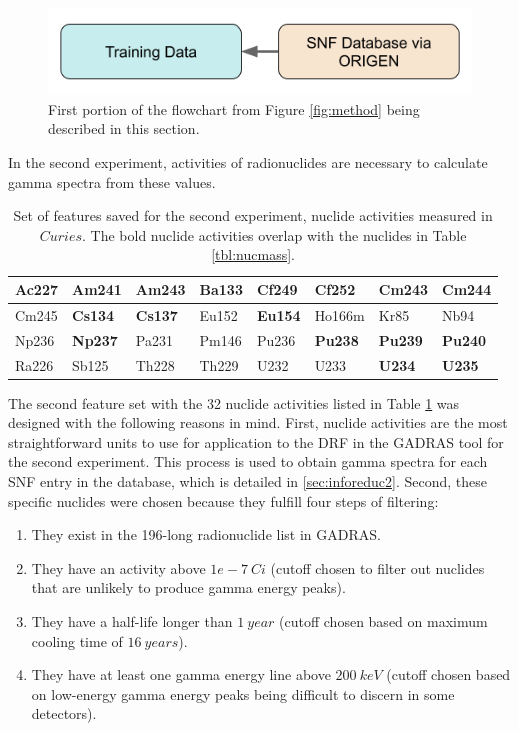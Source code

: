 \begin{figure}[H]
  \centering
  \includegraphics[width=0.7\linewidth]{./chapters/exp1/methodology1.png}
  \caption{First portion of the flowchart from Figure \ref{fig:method} being 
           described in this section.}
\end{figure}


In the second experiment, activities of radionuclides are necessary to
calculate gamma spectra from these values.

\begin{table}[!htb]
  \centering
  \begin{tabular}{@{}|l|l|l|l|l|l|l|l|@{}}
    \hline
    Ac227&\textbf{Am241}&\textbf{Am243}&Ba133&Cf249         &Cf252          &Cm243         &\textbf{Cm244} \\ \hline
    Cm245&\textbf{Cs134}&\textbf{Cs137}&Eu152&\textbf{Eu154}&Ho166m         &Kr85          &Nb94           \\ \hline
    Np236&\textbf{Np237}&Pa231         &Pm146&Pu236         &\textbf{Pu238} &\textbf{Pu239}&\textbf{Pu240} \\ \hline
    Ra226&Sb125         &Th228         &Th229&U232          & U233          &\textbf{U234} &\textbf{U235}  \\ \hline
  \end{tabular}
  \caption{Set of features saved for the second experiment, nuclide activities
           measured in $Curies$. The bold nuclide activities overlap with the 
           nuclides in Table \ref{tbl:nucmass}.}
  \label{tbl:nucacts}
\end{table}

The second feature set with the 32 nuclide activities listed in Table
\ref{tbl:nucacts} was designed with the following reasons in mind. First,
nuclide activities are the most straightforward units to use for application to
the \gls{DRF} in the \gls{GADRAS} tool for the second experiment. This process
is used to obtain gamma spectra for each \gls{SNF} entry in the database, which
is detailed in \ref{sec:inforeduc2}.  Second, these specific nuclides were
chosen because they fulfill four steps of filtering:
\begin{enumerate}
  \item They exist in the 196-long radionuclide list in \gls{GADRAS}.
  \item They have an activity above $1e-7\:Ci$ (cutoff chosen to filter out
  nuclides that are unlikely to produce gamma energy peaks).
  \item They have a half-life longer than $1\:year$ (cutoff chosen based on
  maximum cooling time of $16\:years$).
  \item They have at least one gamma energy line above $200\:keV$ (cutoff
  chosen based on low-energy gamma energy peaks being difficult to discern in
  some detectors).
\end{enumerate}

